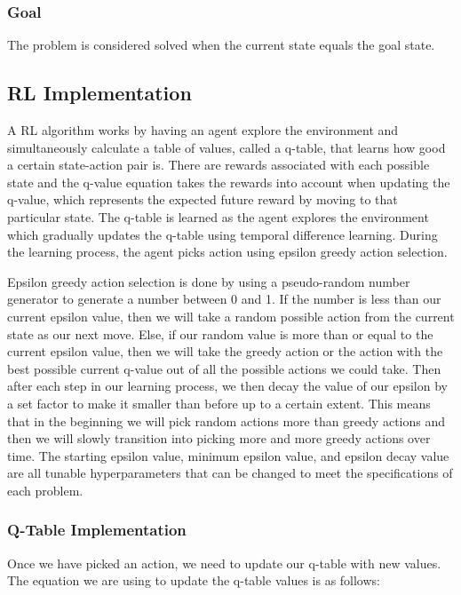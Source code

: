 \documentclass[11pt]{article}
\begin{document}
        \subsubsection{Goal}

        The problem is considered solved when the current state equals the goal state. 
    
    \subsection{RL Implementation}

    A RL algorithm works by having an agent explore the environment and simultaneously calculate a table of values, called a q-table, that learns how good a certain state-action pair is. There are rewards associated with each possible state and the q-value equation takes the rewards into account when updating the q-value, which represents the expected future reward by moving to that particular state. The q-table is learned as the agent explores the environment which gradually updates the q-table using temporal difference learning. During the learning process, the agent picks action using epsilon greedy action selection.

    Epsilon greedy action selection is done by using a pseudo-random number
    generator to generate a number between 0 and 1. If the number is less than
    our current epsilon value, then we will take a random possible action from
    the current state as our next move. Else, if our random value is more than
    or equal to the current epsilon value, then we will take the greedy action
    or the action with the best possible current q-value out of all the possible
    actions we could take. Then after each step in our learning process, we then
    decay the value of our epsilon by a set factor to make it smaller than
    before up to a certain extent. This means that in the beginning we will pick
    random actions more than greedy actions and then we will slowly transition
    into picking more and more greedy actions over time. The starting epsilon
    value, minimum epsilon value, and epsilon decay value are all tunable
    hyperparameters that can be changed to meet the specifications of each
    problem.
    
        \subsubsection{Q-Table Implementation}

        Once we have picked an action, we need to update our q-table with new values. The equation we are using to update the q-table values is as follows:
\end{document}
